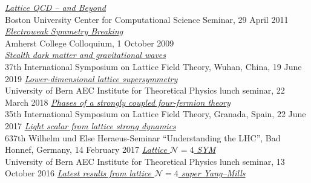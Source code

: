 \begin{spacelist}
\begin{revnumerate}
    \pagebreakitem
      \textit{\href{http://www.davidschaich.net/talks/1104CCS.pdf}{Lattice QCD -- and Beyond}} \\
      Boston University Center for Computational Science Seminar, 29 April 2011
    \pagebreakitem
      \textit{\href{http://www.davidschaich.net/talks/EWSB.pdf}{Electroweak Symmetry Breaking}} \\
      Amherst College Colloquium, 1 October 2009 \\
%
%
%
\vspace{18 pt}
\hspace{-22 pt}{\large \bfseries Contributed talks} \vspace{-8 pt}
    \pagebreakitem
      \textit{\href{http://www.davidschaich.net/talks/1906Lattice.pdf}{Stealth dark matter and gravitational waves}} \\
      37th International Symposium on Lattice Field Theory, Wuhan, China, 19 June 2019
    \pagebreakitem
      \textit{\href{http://www.davidschaich.net/talks/1803Bern.pdf}{Lower-dimensional lattice supersymmetry}} \\
      University of Bern AEC Institute for Theoretical Physics lunch seminar, 22 March 2018
    \pagebreakitem
      \textit{\href{http://www.davidschaich.net/talks/lattice17.pdf}{Phases of a strongly coupled four-fermion theory}} \\
      35th International Symposium on Lattice Field Theory, Granada, Spain, 22 June 2017
    \pagebreakitem
      \textit{\href{http://www.davidschaich.net/talks/1702BadHonnef.pdf}{Light scalar from lattice strong dynamics}} \\
      637th Wilhelm und Else Heraeus-Seminar ``Understanding the LHC'', Bad Honnef, Germany, 14 February 2017
    \pagebreakitem
      \textit{\href{http://www.davidschaich.net/talks/latticeN4_Bern.pdf}{Lattice $\mathcal N = 4$ SYM}} \\
      University of Bern AEC Institute for Theoretical Physics lunch seminar, 13 October 2016
    \pagebreakitem
      \textit{\href{http://www.davidschaich.net/talks/lattice16.pdf}{Latest results from lattice $\mathcal N = 4$ super Yang--Mills}} \\

\end{revnumerate}
\end{spacelist}
